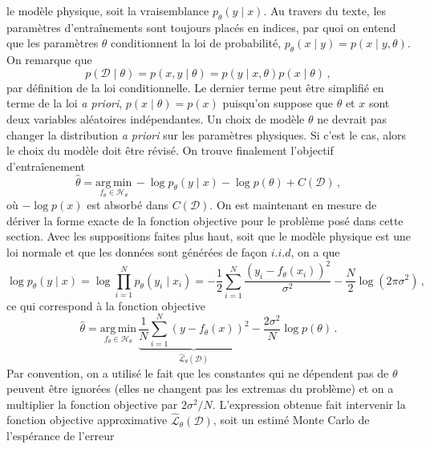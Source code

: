 le modèle physique, soit la vraisemblance $p_\theta( y \mid x)$. Au travers du texte, les paramètres d'entraînements sont toujours placés en indices, 
par quoi on entend que les paramètres $\theta$ conditionnent la loi de probabilité, $p_\theta(x \mid y) = p(x \mid y, \theta)$. On remarque que
\begin{equation}
        p(\mathcal{D} \mid \theta) = p(x, y \mid \theta) = p(y \mid x, \theta) p(x \mid \theta)\, ,
\end{equation} 
par définition de la loi conditionnelle.  Le dernier terme peut être simplifié en terme de la loi \textit{a priori}, $p(x \mid \theta) = p(x)$ 
puisqu'on suppose que $\theta$ et $x$ sont deux variables aléatoires indépendantes. Un choix de modèle $\theta$ ne devrait pas changer 
la distribution \textit{a priori} sur les paramètres physiques. Si c'est le cas, alors le choix du modèle doit être révisé.
On trouve finalement l'objectif d'entraîenement
\begin{equation}
        \hat{\theta} = \underset{f_\theta \in \mathcal{H}_\theta}{\mathrm{arg\, min}}\, -\log p_\theta(y \mid x) - \log p(\theta) + C(\mathcal{D})\, ,
\end{equation} 
où $-\log p(x)$ est absorbé dans $C(\mathcal{D})$. On est maintenant en mesure de dériver la forme exacte de la fonction objective pour le problème 
posé dans cette section. Avec les suppositions faites plus haut, soit que le modèle physique est une loi normale et que les données sont générées de façon 
$i.i.d$, on a que
\begin{equation}
        \log p_\theta(y \mid x) = \log \prod_{i=1}^{N}p_\theta(y_i \mid x_i) = -\frac{1}{2}\sum_{i=1}^{N}\frac{(y_i - f_\theta(x_i))^2}{\sigma^2} - \frac{N}{2}\log(2\pi \sigma^2)\, ,
\end{equation} 
ce qui correspond à la fonction objective
\begin{equation}\label{eq:MSE intro}
        \hat{\theta} = \underset{f_\theta \in \mathcal{H}_\theta}{\mathrm{arg\, min}}\, \underbrace{ \frac{1}{N}\sum_{i=1}^{N}
        (y - f_\theta(x))^2 }_{\hat{\mathcal{L}}_\theta(\mathcal{D})}  - \frac{2\sigma^2}{N}\log p(\theta)\, .
\end{equation} 
Par convention, on a utilisé le fait que les constantes qui ne dépendent pas de $\theta$ peuvent être ignorées (elles ne changent pas les extremas du problème) 
et on a multiplier la fonction objective par $2\sigma^2 / N$. 
L'expression obtenue fait intervenir la fonction objective approximative $\hat{\mathcal{L}}_{\theta}(\mathcal{D})$, soit un estimé Monte Carlo de l'espérance de l'erreur 
